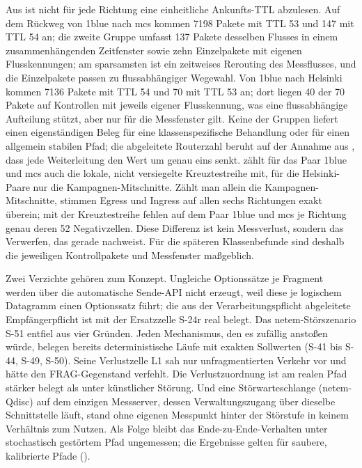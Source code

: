Aus  ist nicht für jede Richtung eine einheitliche Ankunfts-TTL abzulesen. Auf dem Rückweg von
1blue nach mcs kommen 7198 Pakete mit TTL 53 und 147 mit TTL 54 an; die zweite Gruppe umfasst 137 Pakete desselben
Flusses in einem zusammenhängenden Zeitfenster sowie zehn Einzelpakete mit eigenen Flusskennungen; am sparsamsten ist
ein zeitweises Rerouting des Messflusses, und die Einzelpakete passen zu flussabhängiger Wegewahl. Von 1blue nach
Helsinki kommen 7136 Pakete mit TTL 54 und 70 mit TTL 53 an; dort liegen 40 der 70 Pakete auf Kontrollen mit jeweils
eigener Flusskennung, was eine flussabhängige Aufteilung stützt, aber nur für die Messfenster gilt. Keine der Gruppen
liefert einen eigenständigen Beleg für eine klassenspezifische Behandlung oder für einen allgemein stabilen Pfad; die
abgeleitete Routerzahl beruht auf der Annahme aus , dass jede Weiterleitung den Wert um genau eins
senkt.  zählt für das Paar 1blue und mcs auch die lokale, nicht versiegelte Kreuztestreihe mit, für
die Helsinki-Paare nur die Kampagnen-Mitschnitte. Zählt man allein die Kampagnen-Mitschnitte, stimmen Egress und Ingress
auf allen sechs Richtungen exakt überein; mit der Kreuztestreihe fehlen auf dem Paar 1blue und mcs je Richtung genau
deren 52 Negativzellen. Diese Differenz ist kein Messverlust, sondern das Verwerfen, das 
gerade nachweist. Für die späteren Klassenbefunde sind deshalb die jeweiligen Kontrollpakete und Messfenster maßgeblich.

Zwei Verzichte gehören zum Konzept. Ungleiche Options\-sätze je Fragment werden
über die automatische Sende-API nicht erzeugt, weil diese je logischem Datagramm einen Optionssatz
führt; die aus der Verarbeitungspflicht abgeleitete Empfängerpflicht ist mit der Ersatzzelle S-24r real
belegt. Das netem-Störszenario S-51 entfiel aus vier Gründen. Jeden Mechanismus, den es zufällig anstoßen
würde, belegen bereits deterministische Läufe mit exakten Sollwerten (S-41 bis S-44, S-49, S-50). Seine
Verlustzelle L1 sah nur unfragmentierten Verkehr vor und hätte den FRAG-Gegenstand verfehlt. Die
Verlustzuordnung ist am realen Pfad stärker belegt als unter künstlicher Störung. Und eine
Störwarteschlange (netem-Qdisc) auf dem einzigen Messserver, dessen Verwaltungszugang über dieselbe
Schnittstelle läuft, stand ohne eigenen Messpunkt hinter der Störstufe in keinem Verhältnis zum Nutzen.
Als Folge bleibt das Ende-zu-Ende-Verhalten
unter stochastisch gestörtem Pfad ungemessen; die Ergebnisse gelten für saubere, kalibrierte Pfade
().

